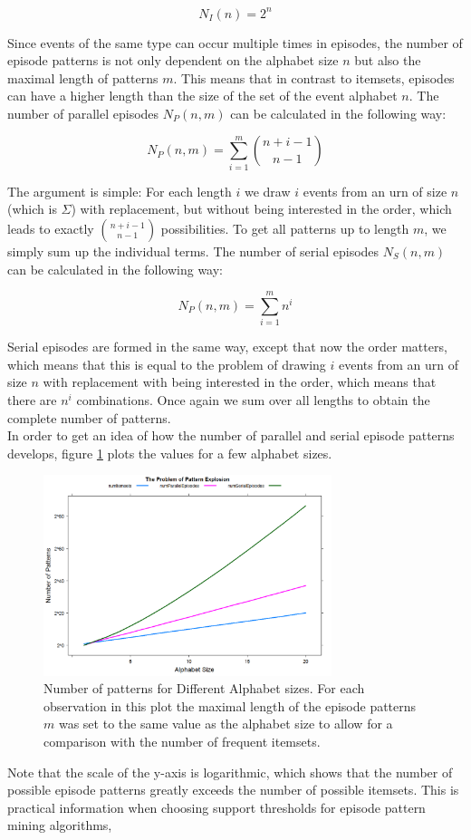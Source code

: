 \begin{equation}
	N_I(n) = 2^n
\end{equation}

Since events of the same type can occur multiple times in episodes, the number of episode patterns is not only dependent on the alphabet size $n$ but also the maximal length of patterns $m$. This means that in contrast to itemsets, episodes can have a higher length than the size of the set of the event alphabet $n$. The number of parallel episodes $N_P(n,m)$ can be calculated in the following way:

\begin{equation}
	N_P(n,m) = \sum_{i=1}^m {{n+i-1}\choose{n-1}}
\end{equation}

The argument is simple: For each length $i$ we draw $i$ events from an urn of size $n$ (which is $\Sigma$) with replacement, but without being interested in the order, which leads to exactly ${n+i-1}\choose{n-1}$ possibilities. To get all patterns up to length $m$, we simply sum up the individual terms. The number of serial episodes $N_S(n,m)$ can be calculated in the following way:

\begin{equation}
	N_P(n,m) = \sum_{i=1}^m n^i
\end{equation}

Serial episodes are formed in the same way, except that now the order matters, which means that this is equal to the problem of drawing $i$ events from an urn of size $n$ with replacement with being interested in the order, which means that there are $n^i$ combinations. Once again we sum over all lengths to obtain the complete number of patterns. \\
In order to get an idea of how the number of parallel and serial episode patterns develops, figure \ref{fig_patternExplosion} plots the values for a few alphabet sizes.

\begin{figure}[h]
	\centering
  	\includegraphics[width=0.75\textwidth]{patternExplosion}
	\caption{Number of patterns for Different Alphabet sizes. For each observation in this plot the maximal length of the episode patterns $m$ was set to the same value as the alphabet size to allow for a comparison with the number of frequent itemsets.}
	\label{fig_patternExplosion}
\end{figure}

Note that the scale of the y-axis is logarithmic, which shows that the number of possible episode patterns greatly exceeds the number of possible itemsets. This is practical information when choosing support thresholds for episode pattern mining algorithms, 